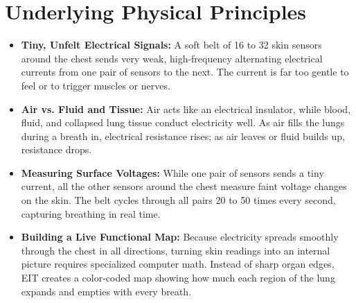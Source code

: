 \section{Underlying Physical Principles}
\begin{itemize}
    \item \textbf{Tiny, Unfelt Electrical Signals:} A soft belt of 16 to 32 skin sensors around the chest sends very weak, high-frequency alternating electrical currents from one pair of sensors to the next. The current is far too gentle to feel or to trigger muscles or nerves.
    \item \textbf{Air vs. Fluid and Tissue:} Air acts like an electrical insulator, while blood, fluid, and collapsed lung tissue conduct electricity well. As air fills the lungs during a breath in, electrical resistance rises; as air leaves or fluid builds up, resistance drops.
    \item \textbf{Measuring Surface Voltages:} While one pair of sensors sends a tiny current, all the other sensors around the chest measure faint voltage changes on the skin. The belt cycles through all pairs 20 to 50 times every second, capturing breathing in real time.
    \item \textbf{Building a Live Functional Map:} Because electricity spreads smoothly through the chest in all directions, turning skin readings into an internal picture requires specialized computer math. Instead of sharp organ edges, EIT creates a color-coded map showing how much each region of the lung expands and empties with every breath.
\end{itemize}

